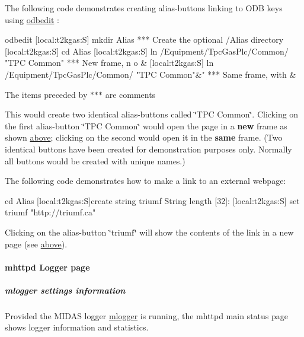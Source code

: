 The following code demonstrates creating alias-\/buttons linking to ODB keys using \hyperlink{RC_odbedit_utility}{odbedit} : 
\begin{DoxyCode}
odbedit
[local:t2kgas:S] mkdir Alias          ***  Create the optional /Alias directory
[local:t2kgas:S] cd Alias
[local:t2kgas:S] ln /Equipment/TpcGasPlc/Common/ "TPC Common"    *** New frame, n
      o &
[local:t2kgas:S] ln /Equipment/TpcGasPlc/Common/ "TPC Common"&"  *** Same frame, 
      with &
\end{DoxyCode}
  The items preceded by {\bfseries $\ast$$\ast$$\ast$} are comments

This would create two identical alias-\/buttons called \char`\"{}TPC Common\char`\"{}. Clicking on the first alias-\/button \char`\"{}TPC Common\char`\"{} would open the page in a {\bfseries new} frame as shown \hyperlink{RC_mhttpd_Alias_page_mhttpd_alias_image}{above}; clicking on the second would open it in the {\bfseries same} frame. (Two identical buttons have been created for demonstration purposes only. Normally all buttons would be created with unique names.)

The following code demonstrates how to make a link to an external webpage: 
\begin{DoxyCode}
 cd Alias
[local:t2kgas:S]create string triumf
String length [32]:
[local:t2kgas:S] set triumf "http://triumf.ca"
\end{DoxyCode}
 Clicking on the alias-\/button \char`\"{}triumf\char`\"{} will show the contents of the link in a new page (see \hyperlink{RC_mhttpd_Alias_page_mhttpd_alias_image}{above}).

\par
 \label{index_end}
\hypertarget{index_end}{}
 \par
 

\par
 \paragraph{mhttpd Logger page}\label{RC_mhttpd_Logger_page}
\label{RC_mhttpd_Logger_page_idx_mhttpd_page_logger}
\hypertarget{RC_mhttpd_Logger_page_idx_mhttpd_page_logger}{}
 \par


\hypertarget{RC_mhttpd_Logger_page_RC_mhttpd_Logger_mlogger}{}\subparagraph{mlogger settings information}\label{RC_mhttpd_Logger_page_RC_mhttpd_Logger_mlogger}
Provided the MIDAS logger \hyperlink{F_Logging_F_mlogger_utility}{mlogger} is running, the mhttpd main status page shows logger information and statistics. \par


